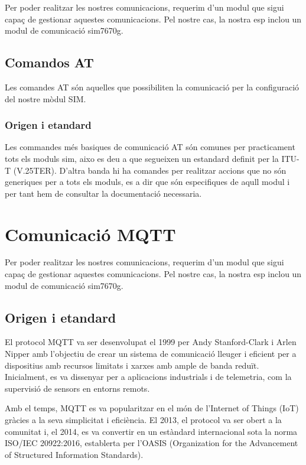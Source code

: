 \documentclass{tfgitic}[2024/07/01]
\begin{document}
Per poder realitzar les nostres comunicacions, requerim d’un modul que sigui capaç de gestionar aquestes 
comunicacions. Pel nostre cas, la nostra esp inclou un modul de comunicació sim7670g.

\section{Comandos AT}

Les comandes AT són  aquelles que possibiliten la comunicació per la configuració del nostre mòdul SIM. 

\subsection*{Origen i etandard}

Les commandes més basiques de comunicació AT són comunes per practicament tots els moduls sim, aixo es 
deu a que segueixen un estandard definit per la ITU-T (V.25TER). D’altra banda hi ha comandes per realitzar 
accions que no són generiques per a tots els moduls, es a dir que són especifiques de aqull modul i per tant 
hem de consultar la documentació necessaria. 

\chapter{Comunicació MQTT}

Per poder realitzar les nostres comunicacions, requerim d’un modul que sigui capaç de gestionar aquestes 
comunicacions. Pel nostre cas, la nostra esp inclou un modul de comunicació sim7670g.

\section{Origen i etandard}

El protocol MQTT va ser desenvolupat el 1999 per Andy Stanford-Clark i Arlen Nipper amb l’objectiu de crear 
un sistema de comunicació lleuger i eficient per a dispositius amb recursos limitats i xarxes amb ample de 
banda reduït. Inicialment, es va dissenyar per a aplicacions industrials i de telemetria, com la supervisió 
de sensors en entorns remots.

Amb el temps, MQTT es va popularitzar en el món de l’Internet of Things (IoT) gràcies a la seva simplicitat 
i eficiència. El 2013, el protocol va ser obert a la comunitat i, el 2014, es va convertir en un estàndard 
internacional sota la norma ISO/IEC 20922:2016, establerta per l’OASIS (Organization for the Advancement of Structured Information Standards).
\end{document}
